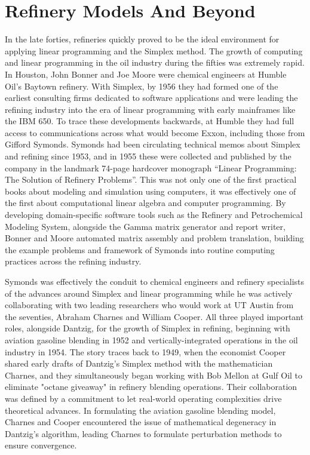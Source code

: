 \section{Refinery Models And Beyond}

In the late forties, refineries quickly proved to be the ideal environment for applying linear programming and the Simplex method. The growth of computing and linear programming in the oil industry during the fifties was extremely rapid. In Houston, John Bonner and Joe Moore were chemical engineers at Humble Oil’s Baytown refinery. With Simplex, by 1956 they had formed one of the earliest consulting firms dedicated to software applications and were leading the refining industry into the era of linear programming with early mainframes like the IBM 650. To trace these developments backwards, at Humble they had full access to communications across what would become Exxon, including those from Gifford Symonds. Symonds had been circulating technical memos about Simplex and refining since 1953, and in 1955 these were collected and published by the company in the landmark 74-page hardcover monograph “Linear Programming: The Solution of Refinery Problems”. This was not only one of the first practical books about modeling and simulation using computers, it was effectively one of the first about computational linear algebra and computer programming. By developing domain-specific software tools such as the Refinery and Petrochemical Modeling System, alongside the Gamma matrix generator and report writer, Bonner and Moore automated matrix assembly and problem translation, building the example problems and framework of Symonds into routine computing practices across the refining industry. \cite{mooreCreatingProfitComputers2003} \cite{symondsLinearProgrammingSolution1955}

Symonds was effectively the conduit to chemical engineers and refinery specialists of the advances around Simplex and linear programming while he was actively collaborating with two leading researchers who would work at UT Austin from the seventies, Abraham Charnes and William Cooper. All three played important roles, alongside Dantzig, for the growth of Simplex in refining, beginning with aviation gasoline blending in 1952 and vertically-integrated operations in the oil industry in 1954. The story traces back to 1949, when the economist Cooper shared early drafts of Dantzig's Simplex method with the mathematician Charnes, and they simultaneously began working with Bob Mellon at Gulf Oil to eliminate "octane giveaway" in refinery blending operations. Their collaboration was defined by a commitment to let real-world operating complexities drive theoretical advances. In formulating the aviation gasoline blending model, Charnes and Cooper encountered the issue of mathematical degeneracy in Dantzig's algorithm, leading Charnes to formulate perturbation methods to ensure convergence. \cite{charnesBlendingAviationGasolines1952}

